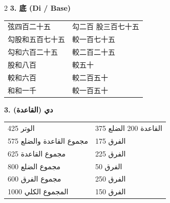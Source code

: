 \documentclass[11pt,a4paper]{article}
\newcommand{\ar}[1]{\arabicfont\beginR #1\endR}
\begin{document}
\begin{paracol}{2}
\textbf{3. 底 (Di / Base)}

\begin{center}
\begin{tabular}{ll}
弦四百二十五 & 勾二百 \quad 股三百七十五 \\
勾股和五百七十五 & 較一百七十五 \\
勾和六百二十五 & 較二百二十五 \\
股和八百 & 較五十 \\
較和六百 & 較二百五十 \\
和和一千 & 較一百五十 \\
\end{tabular}
\end{center}

\switchcolumn

\ar{\textbf{3. دي (القاعدة)}}

\begin{center}
\begin{tabular}{ll}
\ar{الوتر 425} & \ar{القاعدة 200 \quad الضلع 375} \\
\ar{مجموع القاعدة والضلع 575} & \ar{الفرق 175} \\
\ar{مجموع القاعدة 625} & \ar{الفرق 225} \\
\ar{مجموع الضلع 800} & \ar{الفرق 50} \\
\ar{مجموع الفرق 600} & \ar{الفرق 250} \\
\ar{المجموع الكلي 1000} & \ar{الفرق 150} \\
\end{tabular}
\end{center}

\end{paracol}

\vspace{0.3cm}
\end{document}
